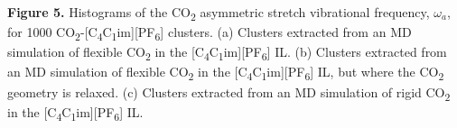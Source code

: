 \documentclass[]{article}
\begin{document}

\textbf{Figure 5.} Histograms of the CO\textsubscript{2} asymmetric
stretch vibrational frequency, \(\omega_{a}\), for 1000
CO\textsubscript{2}-{[}C\textsubscript{4}C\textsubscript{1}im{]}{[}PF\textsubscript{6}{]}
clusters. (a) Clusters extracted from an MD simulation of flexible
CO\textsubscript{2} in the
{[}C\textsubscript{4}C\textsubscript{1}im{]}{[}PF\textsubscript{6}{]}
IL. (b) Clusters extracted from an MD simulation of flexible
CO\textsubscript{2} in the
{[}C\textsubscript{4}C\textsubscript{1}im{]}{[}PF\textsubscript{6}{]}
IL, but where the CO\textsubscript{2} geometry is relaxed. (c) Clusters
extracted from an MD simulation of rigid CO\textsubscript{2} in the
{[}C\textsubscript{4}C\textsubscript{1}im{]}{[}PF\textsubscript{6}{]}
IL.
\end{document}
